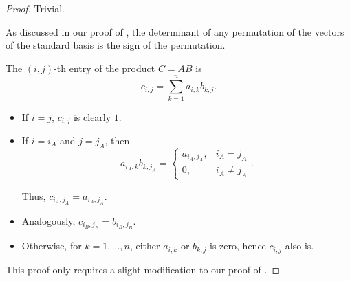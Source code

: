 \begin{proof}
   Trivial.

   As discussed in our proof of , the determinant of any permutation of the vectors of the standard basis is the sign of the permutation.

   The \( (i, j) \)-th entry of the product \( C = AB \) is
  \begin{equation*}
    c_{i,j} = \sum_{k=1}^n a_{i,k} b_{k,j}.
  \end{equation*}

  \begin{itemize}
    \item If \( i = j \), \( c_{i,j} \) is clearly \( 1 \).
    \item If \( i = i_A \) and \( j = j_A \), then
    \begin{equation*}
      a_{i_A,k} b_{k,j_A} = \begin{cases}
        a_{i_A,j_A}, &i_A = j_A \\
        0,           &i_A \neq j_A
      \end{cases}.
    \end{equation*}

    Thus, \( c_{i_A,j_A} = a_{i_A,j_A} \).

    \item Analogously, \( c_{i_B,j_B} = b_{i_B,j_B} \).
    \item Otherwise, for \( k = 1, \ldots, n \), either \( a_{i,k} \) or \( b_{k,j} \) is zero, hence \( c_{i,j} \) also is.
  \end{itemize}

   This proof only requires a slight modification to our proof of .
\end{proof}

